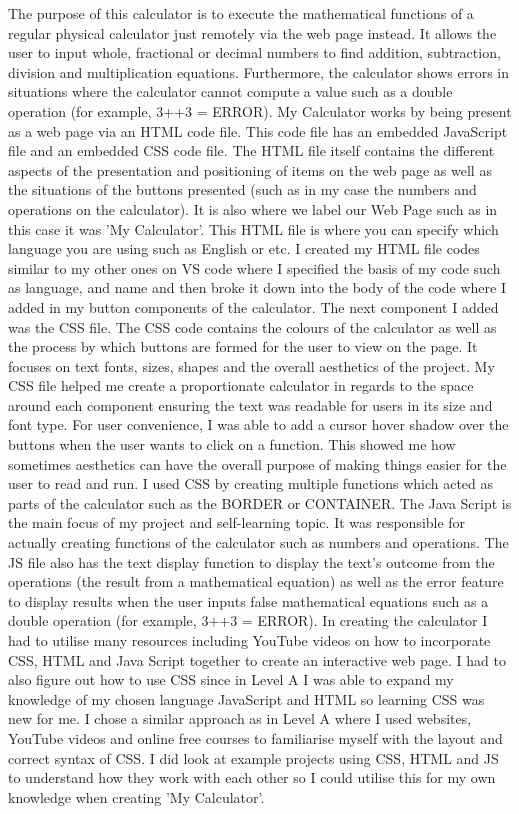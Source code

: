 \documentclass[a4paper, 11pt]{report}
\begin{document}
The purpose of this calculator is to execute the mathematical functions of a regular physical calculator just remotely via the web page instead. It allows the user to input whole, fractional or decimal numbers to find addition, subtraction, division and multiplication equations. Furthermore, the calculator shows errors in situations where the calculator cannot compute a value such as a double operation (for example, 3++3 = ERROR). 
My Calculator works by being present as a web page via an HTML code file. This code file has an embedded JavaScript file and an embedded CSS code file. The HTML file itself contains the different aspects of the presentation and positioning of items on the web page as well as the situations of the buttons presented (such as in my case the numbers and operations on the calculator). It is also where we label our Web Page such as in this case it was 'My Calculator'. This HTML file is where you can specify which language you are using such as English or etc. I created my HTML file codes similar to my other ones on VS code where I specified the basis of my code such as language, and name and then broke it down into the body of the code where I added in my button components of the calculator. The next component I added was the CSS file. The CSS code contains the colours of the calculator as well as the process by which buttons are formed for the user to view on the page. It focuses on text fonts, sizes, shapes and the overall aesthetics of the project. My CSS file helped me create a proportionate calculator in regards to the space around each component ensuring the text was readable for users in its size and font type. For user convenience,  I was able to add a cursor hover shadow over the buttons when the user wants to click on a function. This showed me how sometimes aesthetics can have the overall purpose of making things easier for the user to read and run. I used CSS by creating multiple functions which acted as parts of the calculator such as the BORDER or CONTAINER. The Java Script is the main focus of my project and self-learning topic. It was responsible for actually creating functions of the calculator such as numbers and operations. The JS file also has the text display function to display the text's outcome from the operations (the result from a mathematical equation) as well as the error feature to display results when the user inputs false mathematical equations such as a double operation (for example, 3++3 = ERROR). In creating the calculator I had to utilise many resources including YouTube videos on how to incorporate CSS, HTML and Java Script together to create an interactive web page. I had to also figure out how to use CSS since in Level A I was able to expand my knowledge of my chosen language JavaScript and HTML so learning CSS was new for me. I chose a similar approach as in Level A where I used websites, YouTube videos and online free courses to familiarise myself with the layout and correct syntax of CSS. I did look at example projects using CSS, HTML and JS to understand how they work with each other so I could utilise this for my own knowledge when creating 'My Calculator'.
\cite{LevelB1}
\cite{LevelB2}
\end{document}
